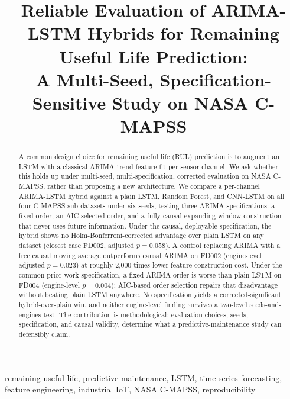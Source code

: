 \documentclass[conference]{IEEEtran}
\newif\ifblind
\begin{document}
\title{Reliable Evaluation of ARIMA-LSTM Hybrids for Remaining Useful Life Prediction: \\ A Multi-Seed, Specification-Sensitive Study on NASA C-MAPSS}

\author{
\ifblind
\IEEEauthorblockN{Anonymous Author(s)}
\IEEEauthorblockA{Affiliation withheld for blind review}
\else
{}
\fi
}

\maketitle

\begin{abstract}
A common design choice for remaining useful life (RUL) prediction is to augment an LSTM with a classical ARIMA trend feature fit per sensor channel. We ask whether this holds up under multi-seed, multi-specification, corrected evaluation on NASA C-MAPSS, rather than proposing a new architecture. We compare a per-channel ARIMA-LSTM hybrid against a plain LSTM, Random Forest, and CNN-LSTM on all four C-MAPSS sub-datasets under six seeds, testing three ARIMA specifications: a fixed order, an AIC-selected order, and a fully causal expanding-window construction that never uses future information. Under the causal, deployable specification, the hybrid shows no Holm-Bonferroni-corrected advantage over plain LSTM on any dataset (closest case FD002, adjusted $p=0.058$). A control replacing ARIMA with a free causal moving average outperforms causal ARIMA on FD002 (engine-level adjusted $p=0.023$) at roughly 2,000 times lower feature-construction cost. Under the common prior-work specification, a fixed ARIMA order is worse than plain LSTM on FD004 (engine-level $p=0.004$); AIC-based order selection repairs that disadvantage without beating plain LSTM anywhere. No specification yields a corrected-significant hybrid-over-plain win, and neither engine-level finding survives a two-level seeds-and-engines test. The contribution is methodological: evaluation choices, seeds, specification, and causal validity, determine what a predictive-maintenance study can defensibly claim.
\end{abstract}

\begin{IEEEkeywords}
remaining useful life, predictive maintenance, LSTM, time-series forecasting, feature engineering, industrial IoT, NASA C-MAPSS, reproducibility
\end{IEEEkeywords}
\end{document}
